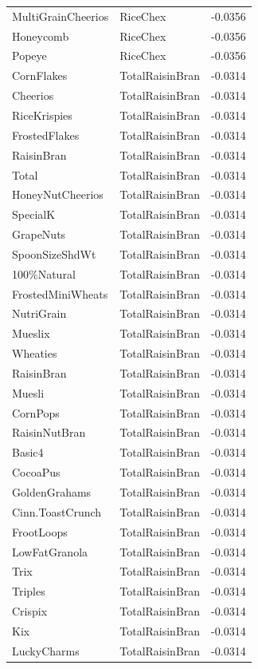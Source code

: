 \begin{table}[!htbp]
\begin{tabular}{lll}
MultiGrainCheerios & RiceChex & -0.0356
\\
Honeycomb & RiceChex & -0.0356
\\
Popeye & RiceChex & -0.0356
\\
CornFlakes & TotalRaisinBran & -0.0314
\\
Cheerios & TotalRaisinBran & -0.0314
\\
RiceKrispies & TotalRaisinBran & -0.0314
\\
FrostedFlakes & TotalRaisinBran & -0.0314
\\
RaisinBran & TotalRaisinBran & -0.0314
\\
Total & TotalRaisinBran & -0.0314
\\
HoneyNutCheerios & TotalRaisinBran & -0.0314
\\
SpecialK & TotalRaisinBran & -0.0314
\\
GrapeNuts & TotalRaisinBran & -0.0314
\\
SpoonSizeShdWt & TotalRaisinBran & -0.0314
\\
100\%Natural & TotalRaisinBran & -0.0314
\\
FrostedMiniWheats & TotalRaisinBran & -0.0314
\\
NutriGrain & TotalRaisinBran & -0.0314
\\
Mueslix & TotalRaisinBran & -0.0314
\\
Wheaties & TotalRaisinBran & -0.0314
\\
RaisinBran & TotalRaisinBran & -0.0314
\\
Muesli & TotalRaisinBran & -0.0314
\\
CornPops & TotalRaisinBran & -0.0314
\\
RaisinNutBran & TotalRaisinBran & -0.0314
\\
Basic4 & TotalRaisinBran & -0.0314
\\
CocoaPus & TotalRaisinBran & -0.0314
\\
GoldenGrahams & TotalRaisinBran & -0.0314
\\
Cinn.ToastCrunch & TotalRaisinBran & -0.0314
\\
FrootLoops & TotalRaisinBran & -0.0314
\\
LowFatGranola & TotalRaisinBran & -0.0314
\\
Trix & TotalRaisinBran & -0.0314
\\
Triples & TotalRaisinBran & -0.0314
\\
Crispix & TotalRaisinBran & -0.0314
\\
Kix & TotalRaisinBran & -0.0314
\\
LuckyCharms & TotalRaisinBran & -0.0314

\end{tabular}
\end{table}

